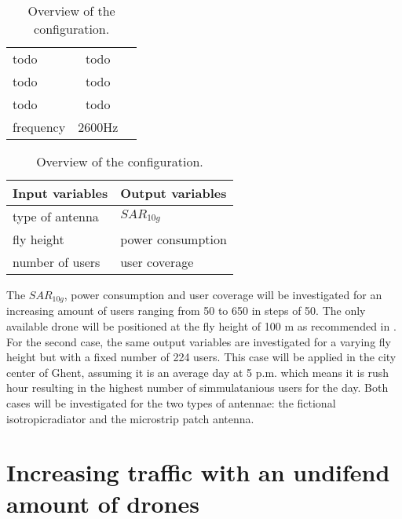 \begin{table}[!htb]
    \begin{minipage}{.5\linewidth}
      \centering
        \begin{tabular}{|l|c|l|}
        \hline
        todo               & todo        \\    
        todo               & todo\\ 
        todo               & todo                     \\ 
        frequency                      & 2600Hz                   \\ 
        \hline
        \end{tabular}
    \end{minipage}%
    \begin{minipage}{.5\linewidth}
      \centering
            \begin{tabular}{|l|l|}
            \hline
            Input variables                & Output variables          \\   \hline 
            type of antenna                & $SAR_{10g}$               \\ 
            fly height                     & power consumption             \\ 
            number of users                & user coverage            \\ 
            \hline
            \end{tabular}
    \end{minipage} 
        \caption{Overview of the configuration.}
        \label{table:confOverviewScenario2}
\end{table}

The $SAR_{10g}$, power consumption and user coverage will be investigated for an increasing amount of users ranging from 50 to 650 in steps of 50.
The only available drone will be positioned at the fly height of 100 m as recommended in \cite{J2}. For the second case, the same output variables are investigated 
for a varying fly height but with a fixed number of 224 users. This case will be applied in the city center of Ghent, assuming it is an average 
day at 5 p.m. which means it is rush hour resulting in the highest number of simmulatanious users for the day\cite{J2}. 
Both cases will be investigated for the two types of antennae: the fictional \gls{isotropicradiator} and the microstrip patch antenna.




\section{Increasing traffic with an undifend amount of drones}

